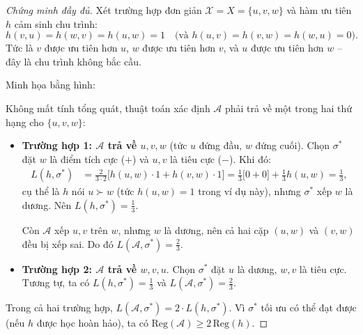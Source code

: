 \begin{proof}[Chứng minh đầy đủ]
Xét trường hợp đơn giản $\mathcal{X} = X = \{u, v, w\}$ và hàm ưu tiên $h$ cảm sinh chu trình:
\[
    h(v, u) = h(w, v) = h(u, w) = 1 \quad \text{(và } h(u,v) = h(v,w) = h(w,u) = 0\text{)}.
\]
Tức là $v$ được ưu tiên hơn $u$, $w$ được ưu tiên hơn $v$, và $u$ được ưu tiên hơn $w$ -- đây là chu trình không bắc cầu.

Minh họa bằng hình:

\begin{center}
\end{center}

Không mất tính tổng quát, thuật toán xác định $\mathcal{A}$ phải trả về một trong hai thứ hạng cho $\{u,v,w\}$:
\begin{itemize}
    \item \textbf{Trường hợp 1: $\mathcal{A}$ trả về $u, v, w$} (tức $u$ đứng đầu, $w$ đứng cuối). Chọn $\sigma^*$ đặt $w$ là điểm tích cực ($+$) và $u, v$ là tiêu cực ($-$). Khi đó:
    \begin{align*}
        L(h, \sigma^*) &= \frac{2}{3 \cdot 2}\bigl[h(u,w)\cdot 1 + h(v,w) \cdot 1\bigr] = \frac{1}{3}\bigl[0 + 0\bigr] + \frac{1}{3} h(u,w) = \frac{1}{3},
    \end{align*}
    cụ thể là $h$ nói $u \succ w$ (tức $h(u,w)=1$ trong ví dụ này), nhưng $\sigma^*$ xếp $w$ là dương. Nên $L(h, \sigma^*) = \frac{1}{3}$.
    
    Còn $\mathcal{A}$ xếp $u, v$ trên $w$, nhưng $w$ là dương, nên cả hai cặp $(u,w)$ và $(v,w)$ đều bị xếp sai. Do đó $L(\mathcal{A}, \sigma^*) = \frac{2}{3}$.
    
    \item \textbf{Trường hợp 2: $\mathcal{A}$ trả về $w, v, u$}. Chọn $\sigma^*$ đặt $u$ là dương, $w, v$ là tiêu cực. Tương tự, ta có $L(h, \sigma^*) = \frac{1}{3}$ và $L(\mathcal{A}, \sigma^*) = \frac{2}{3}$.
\end{itemize}

Trong cả hai trường hợp, $L(\mathcal{A}, \sigma^*) = 2 \cdot L(h, \sigma^*)$. Vì $\sigma^*$ tối ưu có thể đạt được (nếu $h$ được học hoàn hảo), ta có $\mathrm{Reg}(\mathcal{A}) \geq 2 \, \mathrm{Reg}(h)$.
\end{proof}

